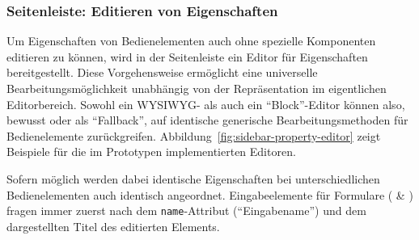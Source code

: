 \subsubsection{Seitenleiste: Editieren von Eigenschaften}

Um Eigenschaften von Bedienelementen auch ohne spezielle Komponenten editieren zu können, wird in der Seitenleiste ein Editor für Eigenschaften bereitgestellt. Diese Vorgehensweise ermöglicht eine universelle Bearbeitungsmöglichkeit unabhängig von der Repräsentation im eigentlichen Editorbereich. Sowohl ein WYSIWYG- als auch ein "`Block"'-Editor können also, bewusst oder als "`Fallback"', auf identische generische Bearbeitungsmethoden für Bedienelemente zurückgreifen. Abbildung~\ref{fig:sidebar-property-editor} zeigt Beispiele für die im Prototypen implementierten Editoren.

Sofern möglich werden dabei identische Eigenschaften bei unterschiedlichen Bedienelementen auch identisch angeordnet. Eingabeelemente für Formulare ( \& ) fragen immer zuerst nach dem \texttt{name}-Attribut ("`Eingabename"') und dem dargestellten Titel des editierten Elements.


